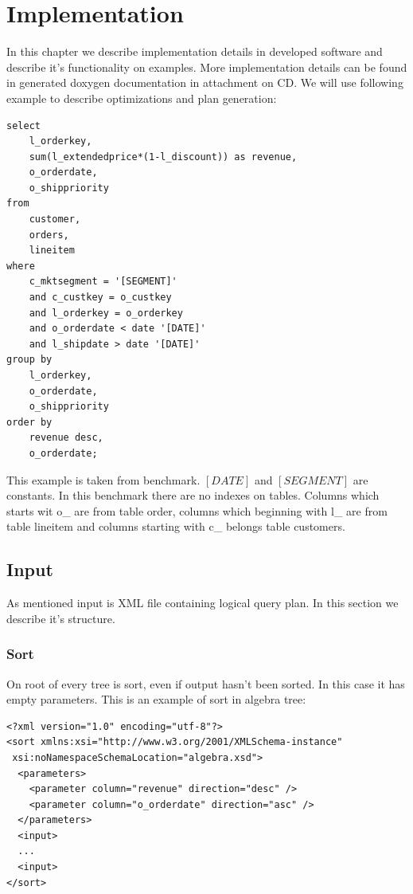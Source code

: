 \chapter{Implementation}

In this chapter we describe implementation details in developed software and describe it's functionality on examples. More implementation details can be found in generated doxygen\cite{doxygen} documentation in attachment on CD. We will use following example to describe optimizations and plan generation:


\begin{verbatim}
select
    l_orderkey,
    sum(l_extendedprice*(1-l_discount)) as revenue,
    o_orderdate,
    o_shippriority
from
    customer,
    orders,
    lineitem
where
    c_mktsegment = '[SEGMENT]'
    and c_custkey = o_custkey
    and l_orderkey = o_orderkey
    and o_orderdate < date '[DATE]'
    and l_shipdate > date '[DATE]'
group by
    l_orderkey,
    o_orderdate,
    o_shippriority
order by
    revenue desc,
    o_orderdate;
\end{verbatim}

This example is taken from benchmark\cite{benchmark}. $[DATE]$ and $[SEGMENT]$ are constants. In this benchmark there are no indexes on tables. Columns which starts wit o\_ are from table order, columns which beginning with l\_ are from table lineitem and columns starting with c\_ belongs table customers.



\section{Input}

As mentioned input is XML file containing logical query plan. In this section we describe it's structure. 

\subsection{Sort}

On root of every tree is sort, even if output hasn't been sorted. In this case it has empty parameters. This is an example of sort in algebra tree:


\begin{lstlisting}
<?xml version="1.0" encoding="utf-8"?>
<sort xmlns:xsi="http://www.w3.org/2001/XMLSchema-instance"
 xsi:noNamespaceSchemaLocation="algebra.xsd">
  <parameters>
    <parameter column="revenue" direction="desc" />
    <parameter column="o_orderdate" direction="asc" />
  </parameters>
  <input>
  ...
  <input>
</sort>
\end{lstlisting}

